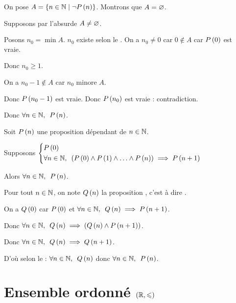 \begin{dem}
On pose \(A=\left\lbrace n\in\mathbb{N}\;\middle|\;\lnot P\left(n\right)\right\rbrace\). Montrons que \(A=\varnothing\).

Supposons par l'absurde \(A\not=\varnothing\).

Posons \(n_0=\min A\). \(n_0\) existe selon le . On a \(n_0\not=0\) car \(0\not\in A\) car \(P\left(0\right)\) est vraie.

Donc \(n_0\geq1\).

On a \(n_0-1\not\in A\) car \(n_0\) minore \(A\).

Donc \(P\left(n_0-1\right)\) est vraie. Donc \(P\left(n_0\right)\) est vraie : contradiction.

Donc \(\quantifs{\forall n\in\N}P\paren{n}\).
\end{dem}

\begin{cor}
Soit \(P\left(n\right)\) une proposition dépendant de \(n\in\mathbb{N}\).

Supposons \(\begin{dcases}P\paren{0} \\ \quantifs{\forall n\in\N}\paren{P\paren{0}\et P\paren{1}\et\dots\et P\paren{n}}\imp P\paren{n+1}\end{dcases}\)

Alors \(\quantifs{\forall n\in\N}P\paren{n}\).
\end{cor}

\begin{dem}
Pour tout \(n\in\mathbb{N}\), on note \(Q\left(n\right)\) la proposition , c'est à dire .

On a \(Q\left(0\right)\) car \(P\left(0\right)\) et \(\quantifs{\forall n\in\N}Q\paren{n}\imp P\paren{n+1}\).

Donc \(\quantifs{\forall n\in\N}Q\paren{n}\imp\paren{Q\paren{n}\et P\paren{n+1}}\).

Donc \(\quantifs{\forall n\in\N}Q\paren{n}\imp Q\paren{n+1}\).

D'où selon le  : \(\quantifs{\forall n\in\N}Q\paren{n}\) donc \(\quantifs{\forall n\in\N}P\paren{n}\).
\end{dem}

\section{Ensemble ordonné \(\left(\mathbb{R},\leqslant\right)\)}

